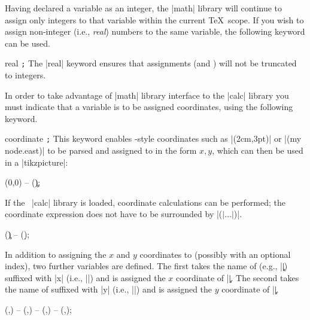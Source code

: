 Having declared a variable as an integer, the |math| library will continue to
assign only integers to that variable within the current \TeX\ scope. If you
wish to assign non-integer (i.e., \emph{real}) numbers to the same variable,
the following keyword can be used.

\begin{math-keyword}{{real} \texttt{;}}
    The |real| keyword ensures that assignments  (and
    ) will not be truncated to integers.
\end{math-keyword}

In order to take advantage of |math| library interface to the |calc| library
you must indicate that a variable is to be assigned coordinates, using the
following keyword.

\begin{math-keyword}{{coordinate} \texttt{;}}
    This keyword enables \tikzname-style coordinates such as |(2cm,3pt)| or
    |(my node.east)| to be parsed and assigned to  in the form
    $x,y$, which can then be used in a |tikzpicture|:
\begin{codeexample}[]
\tikz\draw (0,0) -- (\c);
\end{codeexample}

    If the \tikzname\ |calc| library is loaded, coordinate calculations can be
    performed; the coordinate expression does not have to be surrounded by
    |($|\ldots|$)|.
\begin{codeexample}[]
\tikz\draw (\c) -- (\d);
\end{codeexample}

    In addition to assigning the $x$ and $y$ coordinates to 
    (possibly with an optional index), two further variables are defined. The
    first takes the name of  (e.g., |\c|) suffixed with |x|
    (i.e., |\cx|) and is assigned the $x$ coordinate of |\c|. The second takes
    the name of  suffixed with |y| (i.e., |\cy|) and is assigned
    the $y$ coordinate of |\c|.
\begin{codeexample}[]
\tikz\draw (,) -- (,) -- (,) -- (,);
\end{codeexample}
\end{math-keyword}

